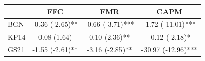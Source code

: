 \begin{tabular}{lccc}
\toprule
 & FFC & FMR & CAPM \\
\midrule
BGN & -0.36 (-2.65)** & -0.66 (-3.71)*** & -1.72 (-11.01)*** \\
KP14 & 0.08 (1.64) & 0.10 (2.36)** & -0.12 (-2.18)* \\
GS21 & -1.55 (-2.61)** & -3.16 (-2.85)** & -30.97 (-12.96)*** \\
\bottomrule
\end{tabular}
